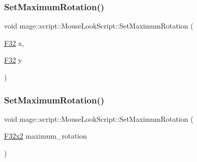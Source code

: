 \subsubsection{\texorpdfstring{Set\+Maximum\+Rotation()}{SetMaximumRotation()}\hspace{0.1cm}{\footnotesize\ttfamily [1/3]}}
{\footnotesize\ttfamily void mage\+::script\+::\+Mouse\+Look\+Script\+::\+Set\+Maximum\+Rotation (\begin{DoxyParamCaption}\item[{\hyperlink{namespacemage_aa97e833b45f06d60a0a9c4fc22ae02c0}{F32}}]{x,  }\item[{\hyperlink{namespacemage_aa97e833b45f06d60a0a9c4fc22ae02c0}{F32}}]{y }\end{DoxyParamCaption})\hspace{0.3cm}{\ttfamily [noexcept]}}

\hypertarget{classmage_1_1script_1_1_mouse_look_script_a878f1268e16f0af89d177fd026b18253}{}\label{classmage_1_1script_1_1_mouse_look_script_a878f1268e16f0af89d177fd026b18253} 
\subsubsection{\texorpdfstring{Set\+Maximum\+Rotation()}{SetMaximumRotation()}\hspace{0.1cm}{\footnotesize\ttfamily [2/3]}}
{\footnotesize\ttfamily void mage\+::script\+::\+Mouse\+Look\+Script\+::\+Set\+Maximum\+Rotation (\begin{DoxyParamCaption}\item[{\hyperlink{namespacemage_aa87237ad091f5cd7da612b8523fc108f}{F32x2}}]{maximum\+\_\+rotation }\end{DoxyParamCaption})\hspace{0.3cm}{\ttfamily [noexcept]}}

\hypertarget{classmage_1_1script_1_1_mouse_look_script_a263e143e671ef56c04132b5e58d114a9}{}\label{classmage_1_1script_1_1_mouse_look_script_a263e143e671ef56c04132b5e58d114a9} 
